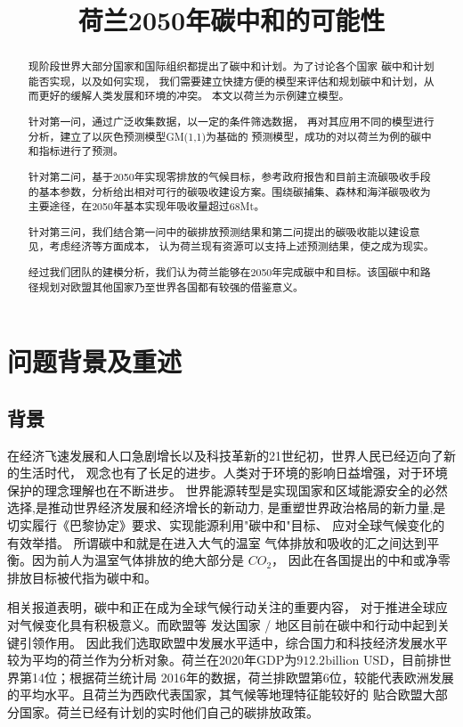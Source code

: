 \documentclass[bwprint]{gmcmthesis}
\title{荷兰2050年碳中和的可能性}
\numberwithin{figure}{section}
\newcommand{\upcite}[1]{\textsuperscript{\textsuperscript{\cite{#1}}}}
\begin{document}
\maketitle
\begin{abstract}
	现阶段世界大部分国家和国际组织都提出了碳中和计划。为了讨论各个国家
	碳中和计划能否实现，以及如何实现，
	我们需要建立快捷方便的模型来评估和规划碳中和计划，从而更好的缓解人类发展和环境的冲突。
	本文以荷兰为示例建立模型。
	
	针对第一问，通过广泛收集数据，以一定的条件筛选数据，
	再对其应用不同的模型进行分析，建立了以灰色预测模型GM(1,1)为基础的
	预测模型，成功的对以荷兰为例的碳中和指标进行了预测。
	
	针对第二问，基于2050年实现零排放的气候目标，参考政府报告和目前主流碳吸收手段的基本参数，分析给出相对可行的碳吸收建设方案。围绕碳捕集、森林和海洋碳吸收为主要途径，在2050年基本实现年吸收量超过68Mt。

	针对第三问，我们结合第一问中的碳排放预测结果和第二问提出的碳吸收能以建设意见，考虑经济等方面成本，
	认为荷兰现有资源可以支持上述预测结果，使之成为现实。

	经过我们团队的建模分析，我们认为荷兰能够在2050年完成碳中和目标。该国碳中和路径规划对欧盟其他国家乃至世界各国都有较强的借鉴意义。

\end{abstract}


\tableofcontents
\newpage
\section{问题背景及重述}
\subsection{背景}
在经济飞速发展和人口急剧增长以及科技革新的21世纪初，世界人民已经迈向了新的生活时代，
观念也有了长足的进步。人类对于环境的影响日益增强，对于环境保护的理念理解也在不断进步。
世界能源转型是实现国家和区域能源安全的必然选择,是推动世界经济发展和经济增长的新动力,
是重塑世界政治格局的新力量,是切实履行《巴黎协定》要求、实现能源利用"碳中和"目标、
应对全球气候变化的有效举措。\upcite{bib:one} 所谓碳中和就是在进入大气的温室
气体排放和吸收的汇之间达到平衡。因为前人为温室气体排放的绝大部分是 $CO_{2}$，
因此在各国提出的中和或净零排放目标被代指为碳中和。\upcite{meaning}

相关报道表明，碳中和正在成为全球气候行动关注的重要内容，
对于推进全球应对气候变化具有积极意义。而欧盟等
发达国家 / 地区目前在碳中和行动中起到关键引领作用。\upcite{bib:3}
因此我们选取欧盟中发展水平适中，综合国力和科技经济发展水平
较为平均的荷兰作为分析对象。荷兰在2020年GDP为$912.2 \text{billion USD}$，目前排世界第14位；根据荷兰统计局
2016年的数据，荷兰排欧盟第6位，较能代表欧洲发展的平均水平。且荷兰为西欧代表国家，其气候等地理特征能较好的
贴合欧盟大部分国家。荷兰已经有计划的实时他们自己的碳排放政策。
\end{document}
